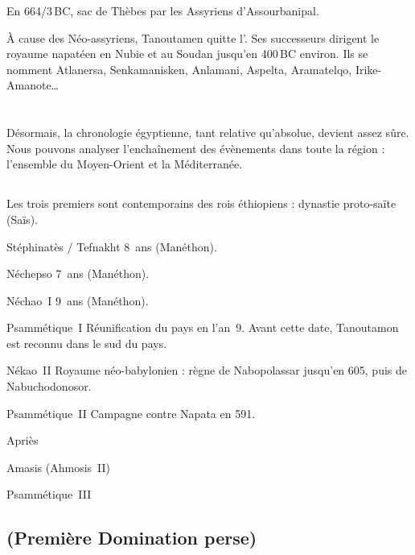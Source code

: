 En 664/3\,BC, sac de Thèbes par les Assyriens d'Assourbanipal.

À cause des Néo-assyriens, Tanoutamen quitte l'\kmt. 
Ses successeurs dirigent le royaume napatéen en Nubie et au Soudan 
jusqu'en \num{400}\,BC environ.
Ils se nomment Atlanersa, Senkamanisken, Anlamani, Aspelta, 
Aramatelqo, Irike-Amanote\dots

\section{\LP}

Désormais, la chronologie égyptienne, tant relative qu'absolue, 
devient assez sûre. Nous pouvons analyser l'enchaînement des 
évènements dans toute la région : l'ensemble du Moyen-Orient et 
la Méditerranée.

\subsection{\texorpdfstring{}{XXVIe dynastie}}


Les trois premiers sont contemporains des rois éthiopiens : dynastie 
\og proto-saïte \fg (Saïs).

\begin{listerois}
  \item [Stéphinatès / Tefnakht] \num{8}~ans (Manéthon).
  \item [Néchepso] \num{7}~ans (Manéthon).
  \item [Néchao~I\ier] \num{9}~ans (Manéthon).
  \item [Psammétique~I\ier \datation{(663-609)}] 
        Réunification du pays en l'an~\num{9}. Avant cette date, 
        Tanoutamon est reconnu dans le sud du pays.
  \item [Nékao~II \datation{(609-594)}]
        Royaume néo-babylonien : règne de Nabopolassar jusqu'en 605, 
        puis de Nabuchodonosor.
  \item [Psammétique~II \datation{(594-588)}] 
        Campagne contre Napata en 591.
  \item [Apriès \datation{(588-568)}]
  \item [Amasis (Ahmosis~II) \datation{(568-526)}]
  \item [Psammétique~III \datation{(526-525)}]
\end{listerois}

\subsection{\texorpdfstring{}{XXVIIe dynastie} (Première 
            Domination perse)}

